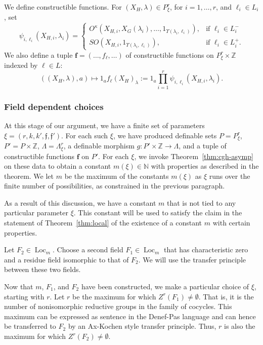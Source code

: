 \documentclass[12pt]{amsart}
\newcommand{\op}[1]{\operatorname{#1}}
\newcommand{\ring}[1]{{\mathbb #1}}
\def\Y{\Upsilon}
\def\s{{\mathfrak{f}}}
\def\bf{\mathbf f}
\theoremstyle{plain}
\theoremstyle{definition}
\begin{document}
We define constructible functions.  For $(X_H,\lambda)\in
P^r_\xi$,  for $i=1,\ldots,r$, and $\ell_i\in L_i$,
set
\begin{equation}\label{eqn:psi}
\psi_{i,\ell_i}(X_{H,i},\lambda_i) = 
\begin{cases}   
  O^\kappa(X_{H,i},X_G(\lambda_i),\ldots,1_{\Y(\lambda_i,\ell_i)}),
   & \text{if } \ell_i\in L^-_i \\
  SO(X_{H,i},1_{\Y(\lambda_i,\ell_i)}),
   & \text{if } \ell_i\in L^+_i.
\end{cases}
\end{equation}
 We also define a tuple $\bf=(\ldots,f_\ell,\ldots)$ of constructible functions
on $P^r_\xi\times\ring{Z}$ indexed by $\ell\in L$:
\[
((X_H,\lambda),a)\mapsto 1_a f_\ell(X_H)_\lambda 
:= 1_a \prod_{i=1}^r \psi_{i,\ell_i}(X_{H,i},\lambda_i).
\]


\subsubsection{Field dependent choices}

At this stage of our argument, we have a finite set of  parameters
$\xi=(r,k,k',\s,\s')$.  For each such $\xi$, we have produced definable sets
$P=P^r_\xi$, $P'=P\times\ring{Z}$,  $\Lambda=\Lambda^r_\xi$, a definable
morphism $g:P'\times\ring{Z}\to \Lambda$, and a tuple of constructible
functions $\bf$ on $P'$.  For each $\xi$, we invoke
Theorem~\ref{thm:cgh-asymp} on these data to obtain a constant
$m(\xi)\in\ring{N}$ with properties as described in the theorem.  We
let $m$ be the maximum of the constants $m(\xi)$ as $\xi$ runs over
the finite number of possibilities, as constrained in the previous
paragraph.

As a result of this discussion, we have a constant $m$ that is not
tied to any particular parameter $\xi$.  This constant will be used to
satisfy the claim in the statement of Theorem~\ref{thm:local} of the
existence of a constant $m$ with certain properties.

Let $F_2\in\op{Loc}_m$.  Choose a second field $F_1\in \op{Loc}_m$
that has characteristic zero and a residue field isomorphic to that of
$F_2$.  We will use the transfer principle between these two fields.

Now that $m$, $F_1$, and $F_2$ have been constructed, we make a
particular choice of $\xi$, starting with $r$.
Let $r$ be the maximum for which $Z^r(F_1)\ne\emptyset$.  That is, it is
the number of nonisomorphic reductive groups in the family of
cocycles.  This maximum can be expressed as sentence in the Denef-Pas
language and can hence be transferred to $F_2$ by an Ax-Kochen style
transfer principle.  Thus, $r$ is also the maximum for which
$Z^r(F_2)\ne\emptyset$.
\end{document}
